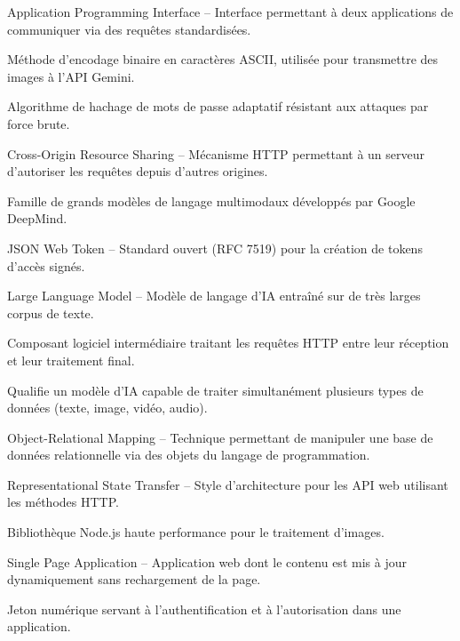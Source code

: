 \documentclass[12pt, a4paper, twoside, openany]{report}
\begin{document}
\begin{description}[style=nextline]
  \item[API] Application Programming Interface -- Interface permettant
    \`a deux applications de communiquer via des requ\^etes standardis\'ees.
  \item[Base64] M\'ethode d'encodage binaire en caract\`eres ASCII, utilis\'ee
    pour transmettre des images \`a l'API Gemini.
  \item[bcrypt] Algorithme de hachage de mots de passe adaptatif r\'esistant
    aux attaques par force brute.
  \item[CORS] Cross-Origin Resource Sharing -- M\'ecanisme HTTP permettant
    \`a un serveur d'autoriser les requ\^etes depuis d'autres origines.
  \item[Gemini] Famille de grands mod\`eles de langage multimodaux d\'evelopp\'es
    par Google DeepMind.
  \item[JWT] JSON Web Token -- Standard ouvert (RFC 7519) pour la cr\'eation de
    tokens d'acc\`es sign\'es.
  \item[LLM] Large Language Model -- Mod\`ele de langage d'IA entra\^in\'e sur
    de tr\`es larges corpus de texte.
  \item[Middleware] Composant logiciel interm\'ediaire traitant les requ\^etes HTTP
    entre leur r\'eception et leur traitement final.
  \item[Multimodal] Qualifie un mod\`ele d'IA capable de traiter simultan\'ement
    plusieurs types de donn\'ees (texte, image, vid\'eo, audio).
  \item[ORM] Object-Relational Mapping -- Technique permettant de manipuler une
    base de donn\'ees relationnelle via des objets du langage de programmation.
  \item[REST] Representational State Transfer -- Style d'architecture pour les
    API web utilisant les m\'ethodes HTTP.
  \item[Sharp] Biblioth\`eque Node.js haute performance pour le traitement
    d'images.
  \item[SPA] Single Page Application -- Application web dont le contenu est mis
    \`a jour dynamiquement sans rechargement de la page.
  \item[Token] Jeton num\'erique servant \`a l'authentification et \`a
    l'autorisation dans une application.
\end{description}

\end{document}
